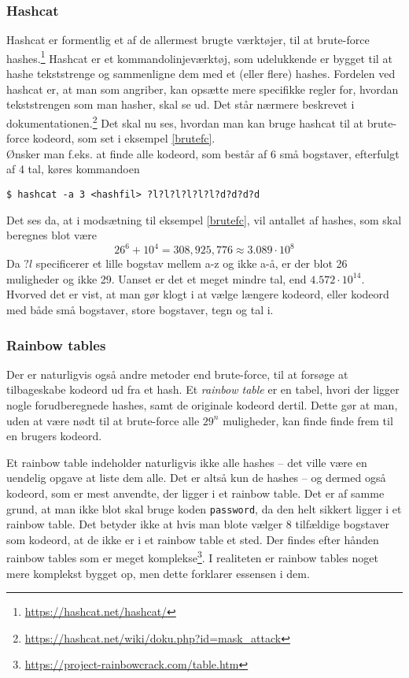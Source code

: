     \subsubsection{Hashcat}
    Hashcat er formentlig et af de allermest brugte værktøjer, til at brute-force hashes.\footnote{\url{https://hashcat.net/hashcat/}}
    Hashcat er et kommandolinjeværktøj, som udelukkende er bygget til at hashe tekststrenge og sammenligne dem med et (eller flere) hashes.
    Fordelen ved hashcat er, at man som angriber, kan opsætte mere specifikke regler for, hvordan tekststrengen som man hasher, skal se ud.
    Det står nærmere beskrevet i dokumentationen.\footnote{\url{https://hashcat.net/wiki/doku.php?id=mask_attack}}
    Det skal nu ses, hvordan man kan bruge hashcat til at brute-force kodeord, som set i eksempel \ref{brutefc}.\\
    Ønsker man f.eks. at finde alle kodeord, som består af 6 små bogstaver, efterfulgt af 4 tal, køres kommandoen
    \begin{verbatim}
$ hashcat -a 3 <hashfil> ?l?l?l?l?l?l?d?d?d?d
    \end{verbatim}
    Det ses da, at i modsætning til eksempel \ref{brutefc}, vil antallet af hashes, som skal beregnes blot være
    \[26^6 + 10^4 = 308,925,776 \approx 3.089 \cdot 10^8\]
    Da \(?l\) specificerer et lille bogstav mellem a-z og ikke a-å, er der blot 26 muligheder og ikke 29.
    Uanset er det et meget mindre tal, end \(4.572 \cdot 10^{14}\). Hvorved det er vist, at man gør klogt i at vælge længere kodeord, eller kodeord med både små bogstaver, store bogstaver, tegn og tal i.

    \subsubsection{Rainbow tables}
    Der er naturligvis også andre metoder end brute-force, til at forsøge at tilbageskabe kodeord ud fra et hash.
    Et \emph{rainbow table} er en tabel, hvori der ligger nogle forudberegnede hashes, samt de originale kodeord dertil.\cite{rainbow}
    Dette gør at man, uden at være nødt til at brute-force alle \(29^n\) muligheder, kan finde finde frem til en brugers kodeord.


    Et rainbow table indeholder naturligvis ikke alle hashes -- det ville være en uendelig opgave at liste dem alle.
    Det er altså kun de hashes -- og dermed også kodeord, som er mest anvendte, der ligger i et rainbow table.
    Det er af samme grund, at man ikke blot skal bruge koden \texttt{password}, da den helt sikkert ligger i et rainbow table.
    Det betyder ikke at hvis man blote vælger 8 tilfældige bogstaver som kodeord, at de ikke er i et rainbow table et sted.
    Der findes efter hånden rainbow tables som er meget komplekse\footnote{\url{https://project-rainbowcrack.com/table.htm}}.
    I realiteten er rainbow tables noget mere komplekst bygget op, men dette forklarer essensen i dem.



